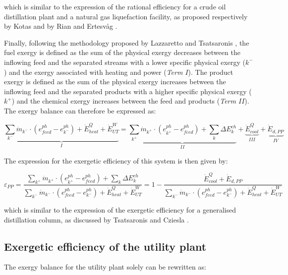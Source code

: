 \documentclass[times,3p]{elsarticle}
\begin{document}
	which is similar to the expression of the rational efficiency for a crude oil distillation plant and a natural gas liquefaction facility, as proposed respectively by Kotas \cite{Kotas1995} and by Rian and Ertesv\aa g \cite{Rian2012}.

Finally, following the methodology proposed by Lazzaretto and Tsatsaronis \cite{Lazzaretto1999,Lazzaretto2006}, the fuel exergy is defined as the sum of the physical exergy decreases between the inflowing feed and the separated streams with a lower specific physical exergy ($k^{-}$) and the exergy associated with heating and power (\emph{Term $I$}). The product exergy is defined as the sum of the physical exergy increases between the inflowing feed and the separated products with a higher specific physical exergy ($k^{+}$) and the chemical exergy increases between the feed and products (\emph{Term $II$}). The exergy balance can therefore be expressed as:

\begin{equation}
\underbrace{\sum_{k^{-}} \dot{m}_{k^{-}}\cdot(e_{feed}^{ph}-e_{k^{-}}^{ph})+\dot{E}^{Q}_{heat}+\dot{E}^{W}_{UT}}_{I}=\underbrace{\sum_{k^{+}}\dot{m}_{k^{+}}\cdot(e_{k^{+}}^{ph}-e_{feed}^{ph})+\sum_k\Delta E^{ch}_k}_{II}+\underbrace{\dot{E}^{Q}_{cool}}_{III}+\underbrace{\dot{E}_{d,PP}}_{IV}	
\end{equation}

The expression for the exergetic efficiency of this system is then given by:

\begin{equation}
	\varepsilon_{PP} =\frac{\sum_{k^{+}}\dot{m}_{k^{+}}\cdot(e_{k^{+}}^{ph}-e_{feed}^{ph})+\sum_k\Delta E^{ch}_k}{\sum_{k^{-}} \dot{m}_{k^{-}}\cdot(e_{feed}^{ph}-e_{k^{-}}^{ph})+\dot{E}^{Q}_{heat}+\dot{E}^{W}_{UT}}=1-\frac{\dot{E}^{Q}_{cool}+\dot{E}_{d,PP}}{\sum_{k^{-}} \dot{m}_{k^{-}}\cdot(e_{feed}^{ph}-e_{k^{-}}^{ph})+\dot{E}^{Q}_{heat}+\dot{E}^{W}_{UT}}
\end{equation}

	which is similar to the expression of the exergetic efficiency for a generalised distillation column, as discussed by Tsatsaronis and Cziesla \cite{Thermoeconomics2001}.  

 \subsection{Exergetic efficiency of the utility plant}
 	
The exergy balance for the utility plant solely can be rewritten as:
\end{document}
